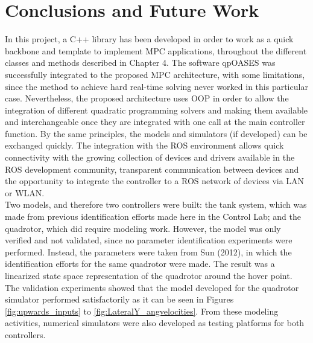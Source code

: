 \chapter{Conclusions and Future Work}
\label{chap:Conclusions_and_Future_Work}

In this project, a C++ library has been developed in order to work as a quick backbone and template to implement MPC applications, throughout  the different classes and methods described in Chapter 4. The software qpOASES was successfully integrated to the proposed MPC architecture, with some limitations, since the method to achieve hard real-time solving never worked in this particular case. Nevertheless, the proposed architecture uses OOP in order to allow the integration of different quadratic programming solvers and making them available and interchangeable once they are integrated with one call at the main controller function. By the same principles, the models and simulators (if developed) can be exchanged quickly. The integration with the ROS environment allows quick connectivity with the growing collection of devices and drivers available in the ROS development community, transparent communication between devices and the opportunity to integrate the controller to a ROS network of devices via LAN or WLAN.  \\ 

Two models, and therefore two controllers were built: the tank system, which was made from previous identification efforts made here in the Control Lab; and the quadrotor, which did require modeling work. However, the model was only verified and not validated, since no parameter identification experiments were performed. Instead, the parameters were taken from Sun \cite{YueSun2012} (2012), in which the identification efforts for the same quadrotor were made. The result was a linearized state space representation of the quadrotor around the hover point. The validation experiments showed that the model developed for the quadrotor simulator performed satisfactorily as it can be seen in Figures \ref{fig:upwards_inputs} to \ref{fig:LateralY_angvelocities}. From these modeling activities, numerical simulators were also developed as testing platforms for both controllers. \\

